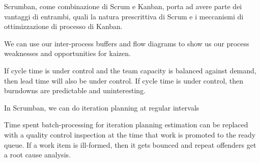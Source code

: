 Scrumban, come combinazione di Scrum e Kanban, porta ad avere parte dei vantaggi di entrambi, quali la natura prescrittiva di Scrum e i meccanismi di ottimizzazione di processo di Kanban.

We can use our inter-process buffers and flow diagrams to show us our process weaknesses and opportunities for kaizen.

If cycle time is under control and the team capacity is balanced against demand, then lead time will also be under control. If cycle time is under control, then burndowns are predictable and uninteresting.

In Scrumban, we can do iteration planning at regular intervals

Time spent batch-processing for iteration planning estimation can be replaced with a quality control inspection at the time that work is promoted to the ready queue. If a work item is ill-formed, then it gets bounced and repeat offenders get a root cause analysis.

